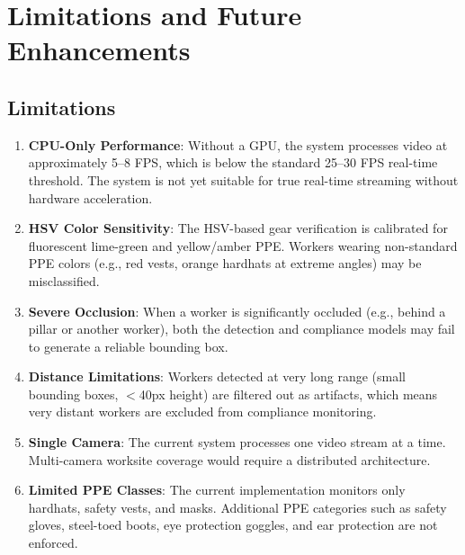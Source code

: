 \documentclass[12pt,a4paper]{report}
\begin{document}
\chapter{Limitations and Future Enhancements}

\section{Limitations}

\begin{enumerate}
    \item \textbf{CPU-Only Performance}: Without a GPU, the system processes video at approximately 5--8 FPS, which is below the standard 25--30 FPS real-time threshold. The system is not yet suitable for true real-time streaming without hardware acceleration.
    
    \item \textbf{HSV Color Sensitivity}: The HSV-based gear verification is calibrated for fluorescent lime-green and yellow/amber PPE. Workers wearing non-standard PPE colors (e.g., red vests, orange hardhats at extreme angles) may be misclassified.
    
    \item \textbf{Severe Occlusion}: When a worker is significantly occluded (e.g., behind a pillar or another worker), both the detection and compliance models may fail to generate a reliable bounding box.
    
    \item \textbf{Distance Limitations}: Workers detected at very long range (small bounding boxes, $<$40px height) are filtered out as artifacts, which means very distant workers are excluded from compliance monitoring.
    
    \item \textbf{Single Camera}: The current system processes one video stream at a time. Multi-camera worksite coverage would require a distributed architecture.
    
    \item \textbf{Limited PPE Classes}: The current implementation monitors only hardhats, safety vests, and masks. Additional PPE categories such as safety gloves, steel-toed boots, eye protection goggles, and ear protection are not enforced.
\end{enumerate}
\end{document}
